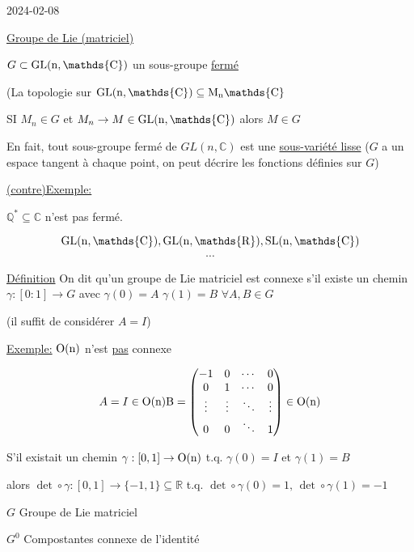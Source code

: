 


2024-02-08

\underline{Groupe de Lie (matriciel)} 

\( G \subset \rm{GL}(n, \mathds{C})\) un sous-groupe \underline{fermé} 

(La topologie sur $\rm{GL}(n, \mathds{C}) \subseteq M_{n} \mathds{C}$


SI \( M_n \in G\) et \(M_n \to M \in \rm{GL}(n, \mathds{C})\) alors \(M \in G\)


\begin{tcolorbox}[title=]
	En fait, tout sous-groupe fermé de \(GL(n, \mathds{C})\) est une \underline{sous-variété lisse} (\(G\) a un espace tangent à chaque point, on peut décrire les fonctions définies sur \(G\))  
\end{tcolorbox}


\underline{(contre)Exemple:} 

\(\mathds{Q}^{*} \subseteq \mathds{C}\) n'est pas fermé.

\begin{tcolorbox}[title=Exemples]
		\[ \rm{GL}(n, \mathds{C}), \rm{GL}(n, \mathds{R}), \rm{SL}(n, \mathds{C}) \]
	\[ \dotsb \] 
\end{tcolorbox}

\underline{Définition} 
On dit qu'un groupe de Lie matriciel est connexe s'il existe un chemin \(\gamma:[0:1] \to G\) avec \(\gamma(0) = A\) \(\gamma(1) =B\) \(\forall A,B \in G\)

(il suffit de considérer \(A = I\))

\underline{Exemple:} \(\rm{O}(n)\) n'est \underline{pas} connexe  

\[ A = I \in \rm{O}(n) B = \begin{pmatrix} -1 &0 & \dotsb & 0\\ 0& 1 & \dotsb & 0 \\ \vdots & \vdots & \ddots & \vdots \\ 0 & 0 & \ddots &1 \end{pmatrix} \in \rm{O}(n) \]

S'il existait un chemin \(\gamma:[0,1] \to \rm{O}(n)\) t.q.  \(\gamma(0) = I\) et \(\gamma(1) = B\)

alors \(\det \circ \gamma : [0,1] \to \{ -1, 1 \} \subseteq \mathds{R} \) t.q. \(\det \circ \gamma (0) = 1,\, \det \circ \gamma(1) = -1  \)


\(G\) Groupe de Lie matriciel 

\(G^0\)  Compostantes connexe de l'identité 

